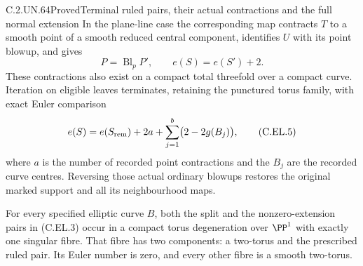 \begin{statement}{C.2.UN.64}{Proved}{Terminal ruled pairs, their actual contractions and the full normal extension}
In the plane-line case the corresponding map contracts $T$ to a
smooth point of a smooth reduced central component, identifies
$U$ with its point blowup, and gives
\[
       P=\operatorname{Bl}_{p}P',\qquad e(S)=e(S')+2.
                                                        \tag{C.EL.4}
\]
These contractions also exist on a compact total threefold over a
compact curve. Iteration on eligible leaves terminates, retaining
the punctured torus family, with exact Euler comparison
\[
 e(S)=e(S_{\rm rem})+2a+\sum_{j=1}^{b}\bigl(2-2g(B_j)\bigr),
                                                        \tag{C.EL.5}
\]
where $a$ is the number of recorded point contractions and the
$B_j$ are the recorded curve centres. Reversing those actual
ordinary blowups restores the original marked support and all
its neighbourhood maps.

For every specified elliptic curve $B$, both the split and the
nonzero-extension pairs in (C.EL.3) occur in a compact torus
degeneration over $\PP^1$ with exactly one singular fibre. That
fibre has two components: a two-torus and the prescribed ruled
pair. Its Euler number is zero, and every other fibre is a smooth
two-torus.
\end{statement}

